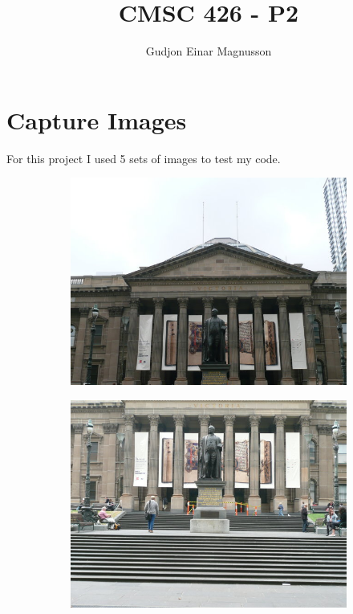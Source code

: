 \documentclass[12pt]{article}
\begin{document}
\title{CMSC 426 - P2}
\author{Gudjon Einar Magnusson}

\maketitle

\section{Capture Images} %
For this project I used 5 sets of images to test my code.

\begin{figure}[t!]
    \begin{subfigure}[t]{0.3\textwidth}
        \centering
        \includegraphics[width=\linewidth]{../Images/Set1/1}
    \end{subfigure}
    \begin{subfigure}[t]{0.3\textwidth}
        \centering
        \includegraphics[width=\linewidth]{../Images/Set1/2}

\end{subfigure}
\end{figure}
\end{document}
